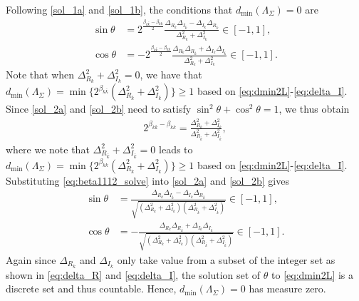\documentclass[12pt, draftclsnofoot, onecolumn]{IEEEtran}
\theoremstyle{definition}
\begin{document}
\begin{IEEEproof}
Following \eqref{sol_1a} and \eqref{sol_1b}, the conditions that $d_{\min}(\Lambda_{\Sigma}) =0$ are
\begin{align}
\sin\theta &= 2^{\frac{\beta_{k\bar{k}}-\beta_{kk}}{2}}\frac{\Delta_{R_k}\Delta_{I_{\bar{k}}}-\Delta_{I_k}\Delta_{R_{\bar{k}}}}{\Delta^2_{R_k}+\Delta^2_{I_k}} \in [-1,1], \label{sol_2a} \\
\cos\theta &= -2^{\frac{\beta_{k\bar{k}}-\beta_{kk}}{2}}\frac{\Delta_{R_k}\Delta_{R_{\bar{k}}}+\Delta_{I_k}\Delta_{I_{\bar{k}}}}{\Delta^2_{R_k}+\Delta^2_{I_k}} \in [-1,1]  \label{sol_2b}.
\end{align}
Note that when $\Delta^2_{R_k}+\Delta^2_{I_k}=0$, we have that $d_{\min}(\Lambda_{\Sigma})=\min\{2^{\beta_{k\bar{k}}}(\Delta^2_{R_{\bar{k}}}+\Delta^2_{I_{\bar{k}}})\}\geq1$ based on \eqref{eq:dmin2L}-\eqref{eq:delta_I}. Since \eqref{sol_2a} and \eqref{sol_2b} need to satisfy $\sin^2\theta+\cos^2\theta = 1$, we thus obtain
\begin{align}\label{eq:beta1112_solve}
2^{\beta_{k\bar{k}}-\beta_{kk}}=\frac{\Delta^2_{R_k}+\Delta^2_{I_k}}{\Delta^2_{R_{\bar{k}}}+\Delta^2_{I_{\bar{k}}}},
\end{align}
where we note that $\Delta^2_{R_{\bar{k}}}+\Delta^2_{I_{\bar{k}}} = 0$ leads to $d_{\min}(\Lambda_{\Sigma})=\min\{2^{\beta_{kk}}(\Delta^2_{R_{k}}+\Delta^2_{I_{k}})\}\geq1$ based on \eqref{eq:dmin2L}-\eqref{eq:delta_I}.
Substituting \eqref{eq:beta1112_solve} into \eqref{sol_2a} and \eqref{sol_2b} gives
\begin{align}
\sin\theta &= \frac{\Delta_{R_k}\Delta_{I_{\bar{k}}}-\Delta_{I_k}\Delta_{R_{\bar{k}}}}{\sqrt{(\Delta^2_{R_k}+\Delta^2_{I_k})(\Delta^2_{R_{\bar{k}}}+\Delta^2_{I_{\bar{k}}})}}\in [-1,1],  \\
\cos\theta &= -\frac{\Delta_{R_k}\Delta_{R_{\bar{k}}}+\Delta_{I_k}\Delta_{I_{\bar{k}}}}{\sqrt{(\Delta^2_{R_k}+\Delta^2_{I_k})(\Delta^2_{R_{\bar{k}}}+\Delta^2_{I_{\bar{k}}})}}\in [-1,1].
\end{align}
Again since $\Delta_{R_k}$ and $\Delta_{I_k}$ only take value from a subset of the integer set as shown in \eqref{eq:delta_R} and \eqref{eq:delta_I}, the solution set of $\theta$ to \eqref{eq:dmin2L} is a discrete set and thus countable. Hence, $d_{\min}(\Lambda_{\Sigma})=0$ has measure zero.
\end{IEEEproof}
\end{document}
